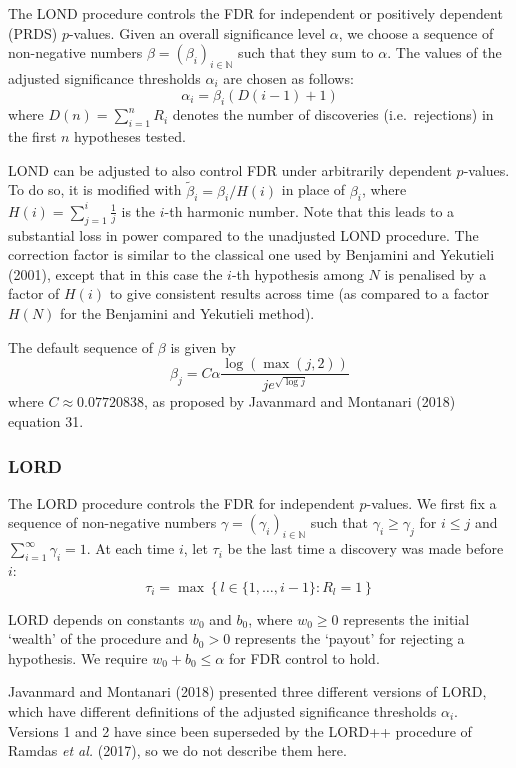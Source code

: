 \documentclass[
]{article}
\begin{document}
The LOND procedure controls the FDR for independent or positively
dependent (PRDS) \(p\)-values. Given an overall significance level
\(\alpha\), we choose a sequence of non-negative numbers
\(\beta = (\beta_i)_{i \in \mathbb{N}}\) such that they sum to
\(\alpha\). The values of the adjusted significance thresholds
\(\alpha_i\) are chosen as follows:
\[ \alpha_i = \beta_i (D(i-1) + 1) \] where \(D(n) = \sum_{i=1}^n R_i\)
denotes the number of discoveries (i.e.~rejections) in the first \(n\)
hypotheses tested.

LOND can be adjusted to also control FDR under arbitrarily dependent
\(p\)-values. To do so, it is modified with
\(\tilde{\beta}_i = \beta_i/H(i)\) in place of \(\beta_i\), where
\(H(i) = \sum_{j=1}^i \frac{1}{j}\) is the \(i\)-th harmonic number.
Note that this leads to a substantial loss in power compared to the
unadjusted LOND procedure. The correction factor is similar to the
classical one used by Benjamini and Yekutieli (2001), except that in
this case the \(i\)-th hypothesis among \(N\) is penalised by a factor
of \(H(i)\) to give consistent results across time (as compared to a
factor \(H(N)\) for the Benjamini and Yekutieli method).

The default sequence of \(\beta\) is given by
\[\beta_j = C \alpha \frac{\log(\max(j, 2))}{j e^{\sqrt{\log j}}}\]
where \(C \approx 0.07720838\), as proposed by Javanmard and Montanari
(2018) equation 31.

\hypertarget{LORD}{%
\subsubsection{LORD}\label{LORD}}

The LORD procedure controls the FDR for independent \(p\)-values. We
first fix a sequence of non-negative numbers
\(\gamma = (\gamma_i)_{i \in \mathbb{N}}\) such that
\(\gamma_i \geq \gamma_j\) for \(i \leq j\) and
\(\sum_{i=1}^{\infty} \gamma_i = 1\). At each time \(i\), let \(\tau_i\)
be the last time a discovery was made before \(i\): \[
\tau_i = \max \left\{ l \in \{1, \ldots, i-1\} : R_l = 1\right\}
\]

LORD depends on constants \(w_0\) and \(b_0\), where \(w_0 \geq 0\)
represents the initial `wealth' of the procedure and \(b_0 > 0\)
represents the `payout' for rejecting a hypothesis. We require
\(w_0+b_0 \leq \alpha\) for FDR control to hold.

Javanmard and Montanari (2018) presented three different versions of
LORD, which have different definitions of the adjusted significance
thresholds \(\alpha_i\). Versions 1 and 2 have since been superseded by
the LORD++ procedure of Ramdas \emph{et al.} (2017), so we do not
describe them here.
\end{document}
